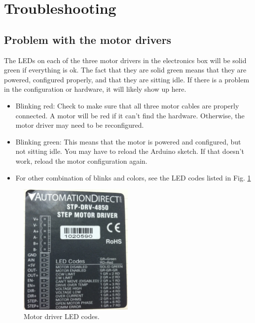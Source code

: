 \documentclass[11pt]{article}
\begin{document}
\section{Troubleshooting}

\subsection{Problem with the motor drivers}
The LEDs on each of the three motor drivers in the electronics box will be solid green if everything is ok.
The fact that they are solid green means that they are powered, configured properly, and that they are sitting idle.  
If there is a problem in the configuration or hardware, it will likely show up here.
\begin{itemize}
 	\item Blinking red:  Check to make sure that all three motor cables are properly connected.  
		A motor will be red if it can't find the hardware.  Otherwise, the motor driver may need to be reconfigured.
	\item Blinking green:  This means that the motor is powered and configured, but not sitting idle.  You may have to reload the Arduino sketch.  If that doesn't work, reload the motor 		configuration again.
	\item For other combination of blinks and colors, see the LED codes listed in Fig. \ref{ledCodes}
\end{itemize}

\begin{figure}[h]
\begin{center}
\includegraphics[width = 2.2in]{photoLedCodes.JPG}
\caption{Motor driver LED codes.}  
\label{ledCodes}
\end{center}
\end{figure}
\end{document}
